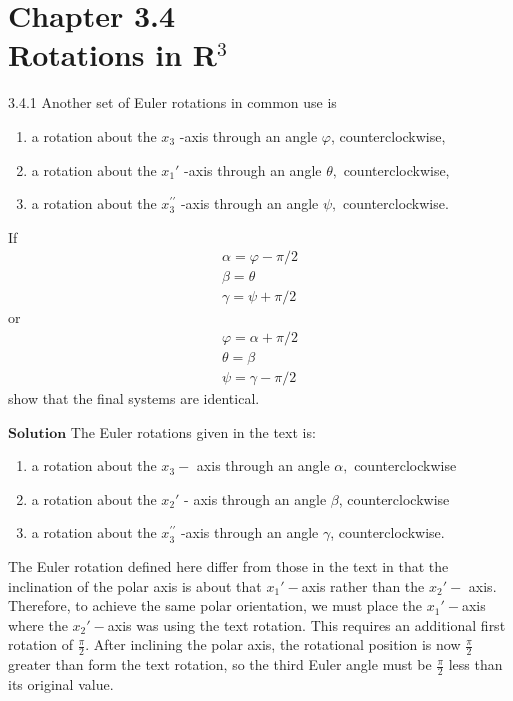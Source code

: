 \documentclass{styles/kaobook}
\begin{document}
\newpage


\chapter*{Chapter 3.4 \\ Rotations in R$^3$}


\begin{greenbox}{3.4.1}
Another set of Euler rotations in common use is
\begin{enumerate}[$(a)$]
\item a rotation about the $x_{3}$ -axis through an angle $\varphi$, counterclockwise,
\item a rotation about the $x_{1}'$ -axis through an angle $\theta,$ counterclockwise,
\item a rotation about the $x_{3}^{\prime \prime}$ -axis through an angle $\psi,$ counterclockwise.
\end{enumerate}
If 
$$
\begin{array}{l}
\alpha=\varphi-\pi / 2 \\
\beta=\theta \\
\gamma=\psi+\pi / 2
\end{array}
$$
or
$$
\begin{array}{l}
\varphi=\alpha+\pi / 2 \\
\theta=\beta \\
\psi=\gamma-\pi / 2
\end{array}
$$
show that the final systems are identical.
\end{greenbox}

$\boxed{\textbf{Solution}}$ The Euler rotations given in the text is:
\begin{enumerate}
\item a rotation about the $x_{3}-$ axis through an angle $\alpha,$ counterclockwise
\item a rotation about the $x_{2}'$ - axis through an angle $\beta$, counterclockwise
\item a rotation about the $x_{3}^{\prime \prime}$ -axis through an angle $\gamma$, counterclockwise.
\end{enumerate}
The Euler rotation defined here differ from those in the text in that the inclination of the polar axis is about that $x_{1}'-$axis rather than the $x_{2}'-$ axis. Therefore, to achieve the same polar orientation, we must place the $x_{1}'-$axis where the $x_{2}'-$axis was using the text rotation. This requires an additional first rotation of $\frac{\pi}{2}$. After inclining the polar axis, the rotational position
is now $\frac{\pi}{2}$ greater than form the text rotation, so the third Euler angle must be $\frac{\pi}{2}$ less than its original value.
\end{document}
